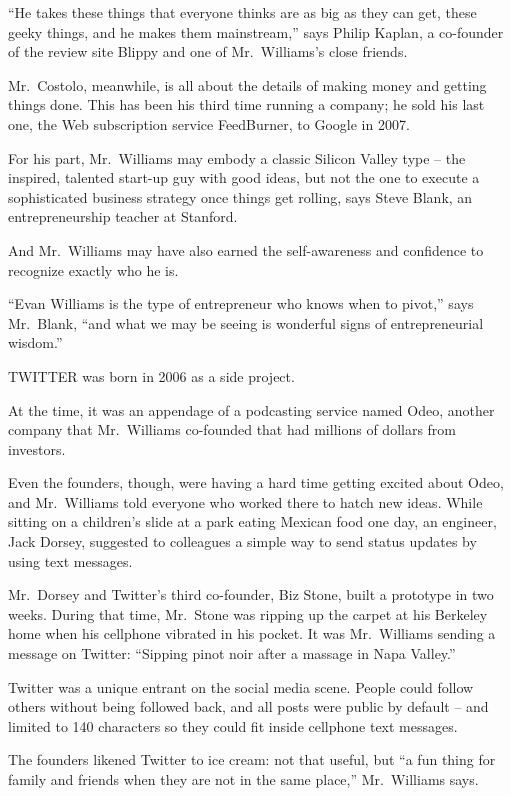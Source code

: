 ﻿\documentclass[12pt]{article}
\begin{document}
``He takes these things that everyone thinks are as big as they can get, these geeky things, and he
makes them mainstream,'' says Philip Kaplan, a co-founder of the review site Blippy and one of
Mr.~Williams's close friends.

Mr.~Costolo, meanwhile, is all about the details of making money and getting things done. This has
been his third time running a company; he sold his last one, the Web subscription service
FeedBurner, to Google in 2007.

For his part, Mr.~Williams may embody a classic Silicon Valley type -- the inspired, talented
start-up guy with good ideas, but not the one to execute a sophisticated business strategy once
things get rolling, says Steve Blank, an entrepreneurship teacher at Stanford.

And Mr.~Williams may have also earned the self-awareness and confidence to recognize exactly who he
is.

``Evan Williams is the type of entrepreneur who knows when to pivot,'' says Mr.~Blank, ``and what we
may be seeing is wonderful signs of entrepreneurial wisdom.''

TWITTER was born in 2006 as a side project.

At the time, it was an appendage of a podcasting service named Odeo, another company that
Mr.~Williams co-founded that had millions of dollars from investors.

Even the founders, though, were having a hard time getting excited about Odeo, and Mr.~Williams told
everyone who worked there to hatch new ideas. While sitting on a children's slide at a park eating
Mexican food one day, an engineer, Jack Dorsey, suggested to colleagues a simple way to send status
updates by using text messages.

Mr.~Dorsey and Twitter's third co-founder, Biz Stone, built a prototype in two weeks. During that
time, Mr.~Stone was ripping up the carpet at his Berkeley home when his cellphone vibrated in his
pocket. It was Mr.~Williams sending a message on Twitter: ``Sipping pinot noir after a massage in
Napa Valley.''

Twitter was a unique entrant on the social media scene. People could follow others without being
followed back, and all posts were public by default -- and limited to 140 characters so they could
fit inside cellphone text messages.

The founders likened Twitter to ice cream: not that useful, but ``a fun thing for family and friends
when they are not in the same place,'' Mr.~Williams says.
\end{document}
